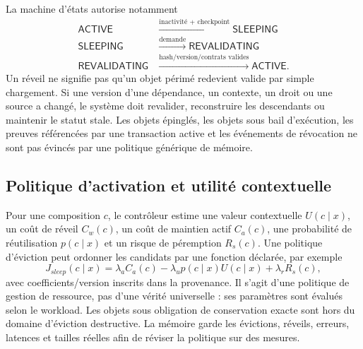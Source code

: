 \documentclass[11pt,a4paper]{article}
\theoremstyle{definition}
\theoremstyle{plain}
\theoremstyle{remark}
\begin{document}
La machine d'états autorise notamment
\[
\begin{aligned}
\mathsf{ACTIVE} &\xrightarrow{\text{inactivité + checkpoint}} \mathsf{SLEEPING}\\
\mathsf{SLEEPING} &\xrightarrow{\text{demande}} \mathsf{REVALIDATING}\\
\mathsf{REVALIDATING} &\xrightarrow{\text{hash/version/contrats valides}} \mathsf{ACTIVE}.
\end{aligned}
\]
Un réveil ne signifie pas qu'un objet périmé redevient valide par simple chargement. Si une version d'une dépendance, un contexte, un droit ou une source a changé, le système doit revalider, reconstruire les descendants ou maintenir le statut stale. Les objets épinglés, les objets sous bail d'exécution, les preuves référencées par une transaction active et les événements de révocation ne sont pas évincés par une politique générique de mémoire.

\subsection{Politique d'activation et utilité contextuelle}
Pour une composition \(c\), le contrôleur estime une valeur contextuelle \(U(c\mid x)\), un coût de réveil \(C_w(c)\), un coût de maintien actif \(C_a(c)\), une probabilité de réutilisation \(p(c\mid x)\) et un risque de péremption \(R_s(c)\). Une politique d'éviction peut ordonner les candidats par une fonction déclarée, par exemple
\[
J_{sleep}(c\mid x)=\lambda_a C_a(c)-\lambda_u p(c\mid x)U(c\mid x)+\lambda_r R_s(c),
\]
avec coefficients/version inscrits dans la provenance. Il s'agit d'une politique de gestion de ressource, pas d'une vérité universelle : ses paramètres sont évalués selon le workload. Les objets sous obligation de conservation exacte sont hors du domaine d'éviction destructive. La mémoire garde les évictions, réveils, erreurs, latences et tailles réelles afin de réviser la politique sur des mesures.
\end{document}
